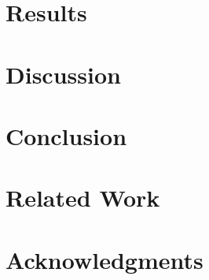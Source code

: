 \documentclass[11pt]{article}
\begin{document}
\section{Results}



\section{Discussion}

\section{Conclusion}





\section{Related Work}

\section*{Acknowledgments}
\end{document}
